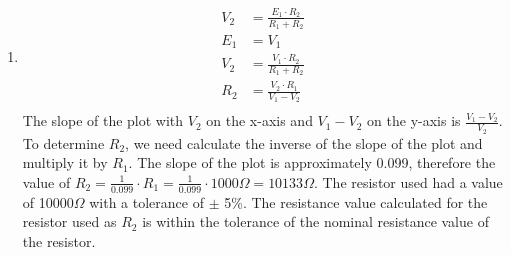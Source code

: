 \documentclass[12pt]{article}
\begin{document}
\begin{enumerate}
    \item
    \[
        \begin{aligned}
            V_2 &= \frac{E_1 \cdot R_2}{R_1 + R_2} \\
            E_1 &= V_1 \\
            V_2 &= \frac{V_1 \cdot R_2}{R_1 + R_2} \\
            R_2 &= \frac{V_2 \cdot R_1}{V_1 - V_2} \\
        \end{aligned} 
    \]
    The slope of the plot with $V_2$ on the x-axis and $V_1-V_2$ on the y-axis is $\frac{V_1-V_2}{V_2}$. To determine $R_2$, we need calculate the inverse of the slope of the plot and multiply it by $R_1$. The slope of the plot is approximately 0.099, therefore the value of $R_2 = \frac{1}{0.099} \cdot R_1 = \frac{1}{0.099} \cdot 1000\Omega = 10133\Omega$. The resistor used had a value of 10000$\Omega$ with a tolerance of $\pm$ 5\%. The resistance value calculated for the resistor used as $R_2$ is within the tolerance of the nominal resistance value of the resistor.
\end{enumerate}
\end{document}
